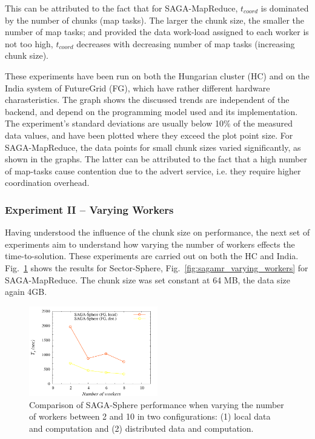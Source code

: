\documentclass[3p,twocolumn]{elsarticle}
\begin{document}
This can be attributed to the fact that for SAGA-MapReduce,
$t_{coord}$ is dominated by the number of chunks (map tasks).
The larger the chunk size, the smaller the number
of map tasks; and provided the data work-load assigned to each worker
is not too high, $t_{coord}$ decreases with decreasing number of map
tasks (increasing chunk size).

These experiments have been run on both the Hungarian cluster (HC) and
on the India system of FutureGrid (FG), which have rather different hardware
charasteristics.  The graph shows the discussed trends are independent
of the backend, and depend on the programming model used and its
implementation. The experiment's standard deviations are usually below
10\% of the measured data values, and have been plotted where they
exceed the plot point size.  For SAGA-MapReduce, the data points for
small chunk sizes varied significantly, as shown in the graphs.
The latter can be attributed to the fact that a high number of map-tasks
cause contention due to the advert service, i.e. they require higher
coordination overhead.


\subsubsection{Experiment II -- Varying Workers}

Having understood the influence of the chunk size on performance, the
next set of experiments aim to understand how varying the number of
workers effects the time-to-solution. These experiments are carried
out on both the HC and India.
Fig.~\ref{fig:sphere_varying_workers} shows the results for
Sector-Sphere, Fig.~\ref{fig:sagamr_varying_workers} for
SAGA-MapReduce.  The chunk size was set constant at 64 MB, the data
size again 4GB.

\begin{figure}[htb!]
 \includegraphics[width=0.5\textwidth]{figures/sphere_varying_workers.pdf}
 \caption{
   Comparison of SAGA-Sphere performance when varying the number of workers
   between 2 and 10 in two configurations: (1) local data and computation
   and (2) distributed data and computation.
   \label{fig:sphere_varying_workers}
   }
\end{figure}
\end{document}
